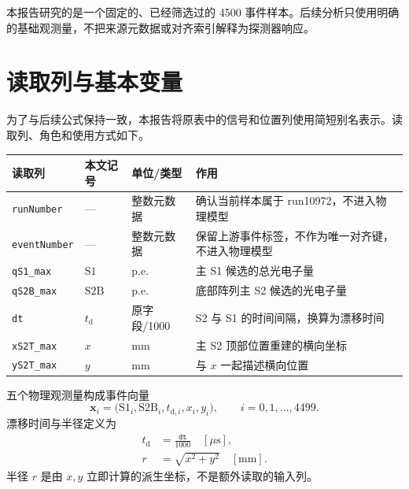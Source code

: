 \documentclass[UTF8,11pt,a4paper,oneside,fontset=none]{ctexart}
\newcommand{\SoneLY}{\mathrm{S1}}
\newcommand{\StwoLY}{\mathrm{S2B}}
\begin{document}
\begin{conclusionbox}
本报告研究的是一个固定的、已经筛选过的 4500 事件样本。后续分析只使用明确的基础观测量，不把来源元数据或对齐索引解释为探测器响应。
\end{conclusionbox}
\clearpage

\section{读取列与基本变量}

为了与后续公式保持一致，本报告将原表中的信号和位置列使用简短别名表示。读取列、角色和使用方式如下。

\small
{}
\begin{tabularx}{\textwidth}{@{}C{3.0cm} C{2.25cm} C{2.2cm} Y@{}}
\toprule
{}\textbf{读取列} & \textbf{本文记号} & \textbf{单位/类型} & \textbf{作用}\\
\midrule
\texttt{runNumber} & --- & 整数元数据 & 确认当前样本属于 run10972，不进入物理模型\\
\texttt{eventNumber} & --- & 整数元数据 & 保留上游事件标签，不作为唯一对齐键，不进入物理模型\\
\texttt{qS1\_max} & \(\SoneLY\) & p.e. & 主 S1 候选的总光电子量\\
\texttt{qS2B\_max} & \(\StwoLY\) & p.e. & 底部阵列主 S2 候选的光电子量\\
\texttt{dt} & \(t_{\mathrm d}\) & 原字段/1000 & S2 与 S1 的时间间隔，换算为漂移时间\\
\texttt{xS2T\_max} & \(x\) & mm & 主 S2 顶部位置重建的横向坐标\\
\texttt{yS2T\_max} & \(y\) & mm & 与 \(x\) 一起描述横向位置\\
\bottomrule
\end{tabularx}
\normalsize

\vspace{0.55em}
五个物理观测量构成事件向量
\begin{equation}
  \symbf{x}_i=
  \bigl(\SoneLY_i,\StwoLY_i,t_{\mathrm d,i},x_i,y_i\bigr),
  \qquad i=0,1,\ldots,4499.
\end{equation}
漂移时间与半径定义为
\begin{align}
  t_{\mathrm d} &= \frac{\texttt{dt}}{1000}
  \quad [\mu\mathrm{s}],\\
  r &= \sqrt{x^2+y^2}
  \quad [\mathrm{mm}].
\end{align}
半径 \(r\) 是由 \(x,y\) 立即计算的派生坐标，不是额外读取的输入列。
\end{document}

